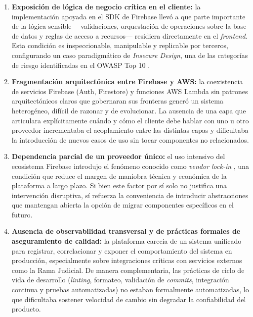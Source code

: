 \begin{enumerate}
  \item \textbf{Exposición de lógica de negocio crítica en el cliente:} la implementación apoyada en el SDK de Firebase llevó a que parte importante de la lógica sensible —validaciones, orquestación de operaciones sobre la base de datos y reglas de acceso a recursos— residiera directamente en el \textit{frontend}. Esta condición es inspeccionable, manipulable y replicable por terceros, configurando un caso paradigmático de \textit{Insecure Design}, una de las categorías de riesgo identificadas en el OWASP Top 10 \cite{OWASP2021}.

  \item \textbf{Fragmentación arquitectónica entre Firebase y AWS:} la coexistencia de servicios Firebase (Auth, Firestore) y funciones AWS Lambda sin patrones arquitectónicos claros que gobernaran sus fronteras generó un sistema heterogéneo, difícil de razonar y de evolucionar. La ausencia de una capa que articulara explícitamente cuándo y cómo el cliente debe hablar con uno u otro proveedor incrementaba el acoplamiento entre las distintas capas y dificultaba la introducción de nuevos casos de uso sin tocar componentes no relacionados.

  \item \textbf{Dependencia parcial de un proveedor único:} el uso intensivo del ecosistema Firebase introdujo el fenómeno conocido como \textit{vendor lock-in} \cite{OparaMartins2016, OparaMartins2014, Harauzek2022}, una condición que reduce el margen de maniobra técnica y económica de la plataforma a largo plazo. Si bien este factor por sí solo no justifica una intervención disruptiva, sí refuerza la conveniencia de introducir abstracciones que mantengan abierta la opción de migrar componentes específicos en el futuro.

  \item \textbf{Ausencia de observabilidad transversal y de prácticas formales de aseguramiento de calidad:} la plataforma carecía de un sistema unificado para registrar, correlacionar y exponer el comportamiento del sistema en producción, especialmente sobre integraciones críticas con servicios externos como la Rama Judicial. De manera complementaria, las prácticas de ciclo de vida de desarrollo (\textit{linting}, formateo, validación de \textit{commits}, integración continua y pruebas automatizadas) no estaban formalmente automatizadas, lo que dificultaba sostener velocidad de cambio sin degradar la confiabilidad del producto.
\end{enumerate}

